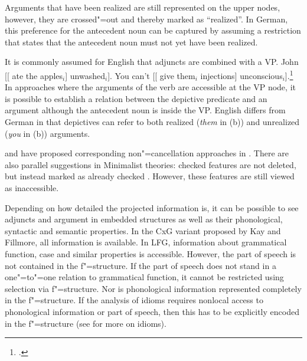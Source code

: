 Arguments that have been realized are still represented on the upper nodes, however, they are crossed"=out and thereby marked as ``realized''.
In German, this preference for the antecedent noun can be captured by assuming a restriction that states that the antecedent noun must not yet have been
realized.

It is commonly assumed for English that adjuncts are combined with a VP.
\eal
\ex John [[ ate the apples$_i$] unwashed$_i$].
\ex You can't [[ give them$_i$ injections] unconscious$_i$].\footnote{%
.
}
\zl
In approaches where the arguments of the verb are accessible at the VP node, it is possible to establish a relation between
the depictive predicate and an argument although the antecedent noun is inside the VP.
English differs from German in that depictives can refer to both realized (\emph{them} in (b))
and unrealized (\emph{you} in (b)) arguments.

\citet[]{Higginbotham85a} and \citet{Winkler97a} have proposed corresponding non"=cancellation approaches in \gbt.
There are also parallel suggestions in Minimalist theories: checked features are not deleted, but instead marked as already
checked \citep[]{Stabler2010b}. However, these features are still viewed as inaccessible.\label{page-non-cancellation-end}

Depending on how detailed the projected information is, it can be possible to see adjuncts and argument in embedded structures as well as their
phonological, syntactic and semantic properties. In the CxG variant proposed by Kay and Fillmore, all information is available. In LFG,
information about grammatical function, case and similar properties is accessible. However, the part of speech is not contained in the f"=structure.
If the part of speech does not stand in a one"=to"=one relation to grammatical function, it cannot be restricted using selection via f"=structure.
Nor is phonological information represented completely in the f"=structure. If the analysis of idioms requires nonlocal access to phonological
information or part of speech, then this has to be explicitly encoded in the f"=structure (see  for more on idioms). 

